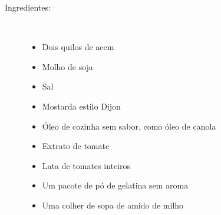 \documentclass [11pt, letterpaper] {article}
\begin{document}
\begin {description}

\item [Ingredientes:] \ \\
\begin {itemize}
\item Dois quilos de acem
\item Molho de soja
\item Sal
\item Mostarda estilo Dijon
\item Óleo de cozinha sem sabor, como óleo de canola
\item Extrato de tomate
\item Lata de tomates inteiros
\item Um pacote de pó de gelatina sem aroma
\item Uma colher de sopa de amido de milho
\end {itemize}



\end{description}
\end{document}
